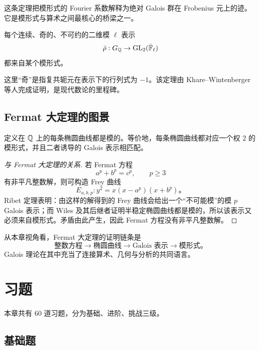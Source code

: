\begin{remark}
这条定理把模形式的 Fourier 系数解释为绝对 Galois 群在 Frobenius 元上的迹。它是模形式与算术之间最核心的桥梁之一。
\end{remark}

\begin{theorem}
每个连续、奇的、不可约的二维模 $\ell$ 表示
\[
\bar\rho:G_{\mathbb{Q}}\to\mathrm{GL}_2(\bar{\mathbb{F}}_{\ell})
\]
都来自某个模形式。
\end{theorem}

\begin{remark}
这里“奇”是指复共轭元在表示下的行列式为 $-1$。该定理由 Khare--Wintenberger 等人完成证明，是现代数论的里程碑。
\end{remark}

\subsection*{Fermat 大定理的图景}

\begin{theorem}[模性定理，陈述]
定义在 $\mathbb{Q}$ 上的每条椭圆曲线都是模的。等价地，每条椭圆曲线都对应一个权 $2$ 的模形式，并且二者诱导的 Galois 表示相匹配。
\end{theorem}

\begin{proof}[与 Fermat 大定理的关系]
若 Fermat 方程
\[
a^p+b^p=c^p,
\qquad
p\ge3
\]
有非平凡整数解，则可构造 Frey 曲线
\[
E_{a,b,p}:y^2=x(x-a^p)(x+b^p)。
\]
Ribet 定理表明：由这样的解得到的 Frey 曲线会给出一个“不可能模”的模 $p$ Galois 表示；而 Wiles 及其后继者证明半稳定椭圆曲线都是模的，所以该表示又必须来自模形式。矛盾由此产生，因此 Fermat 方程没有非平凡整数解。
\end{proof}

\begin{remark}
从本章视角看，Fermat 大定理的证明链条是
\[
\text{整数方程}\to\text{椭圆曲线}\to\text{Galois 表示}\to\text{模形式}。
\]
Galois 理论在其中充当了连接算术、几何与分析的共同语言。
\end{remark}

\section*{习题}

本章共有 60 道习题，分为基础、进阶、挑战三级。

\subsection*{基础题}

